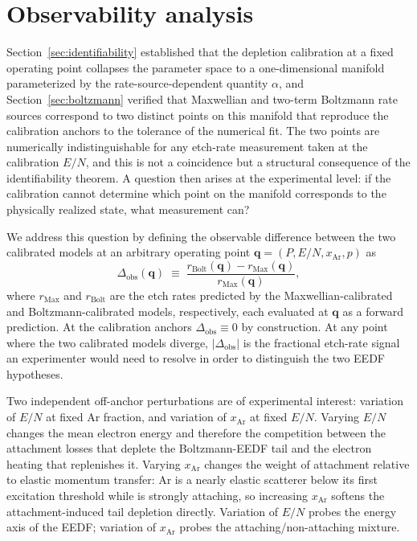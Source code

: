 \section{Observability analysis}
\label{sec:observability}

Section~\ref{sec:identifiability} established that the depletion
calibration at a fixed operating point collapses the parameter
space to a one-dimensional manifold parameterized by the
rate-source-dependent quantity $\alpha$, and
Section~\ref{sec:boltzmann} verified that Maxwellian and two-term
Boltzmann rate sources correspond to two distinct points on this
manifold that reproduce the calibration anchors to the tolerance
of the numerical fit. The two points are numerically
indistinguishable for any etch-rate measurement taken at the
calibration $E/N$, and this is not a coincidence but a structural
consequence of the identifiability theorem. A question then arises
at the experimental level: if the calibration cannot determine
which point on the manifold corresponds to the physically realized
state, what measurement can?

We address this question by defining the observable difference
between the two calibrated models at an arbitrary operating point
$\mathbf{q} = (P, E/N, x_{\mathrm{Ar}}, p)$ as
\begin{equation}
  \Delta_{\mathrm{obs}}(\mathbf{q})
  \;\equiv\;
  \frac{r_{\mathrm{Bolt}}(\mathbf{q}) - r_{\mathrm{Max}}(\mathbf{q})}
       {r_{\mathrm{Max}}(\mathbf{q})},
  \label{eq:delta-obs}
\end{equation}
where $r_{\mathrm{Max}}$ and $r_{\mathrm{Bolt}}$ are the etch rates
predicted by the Maxwellian-calibrated and Boltzmann-calibrated
models, respectively, each evaluated at $\mathbf{q}$ as a forward
prediction. At the calibration anchors
$\Delta_{\mathrm{obs}} \equiv 0$ by construction. At any point
where the two calibrated models diverge,
$|\Delta_{\mathrm{obs}}|$ is the fractional etch-rate signal an
experimenter would need to resolve in order to distinguish the two
EEDF hypotheses.

Two independent off-anchor perturbations are of experimental
interest: variation of $E/N$ at fixed Ar fraction, and variation of
$x_{\mathrm{Ar}}$ at fixed $E/N$. Varying $E/N$ changes the mean
electron energy and therefore the competition between the
attachment losses that deplete the Boltzmann-EEDF tail and the
electron heating that replenishes it. Varying $x_{\mathrm{Ar}}$
changes the weight of attachment relative to elastic momentum
transfer: Ar is a nearly elastic scatterer below its first
excitation threshold while \sfsix{} is strongly attaching, so
increasing $x_{\mathrm{Ar}}$ softens the attachment-induced tail
depletion directly. Variation of $E/N$ probes the energy axis of
the EEDF; variation of $x_{\mathrm{Ar}}$ probes the
attaching/non-attaching mixture.

